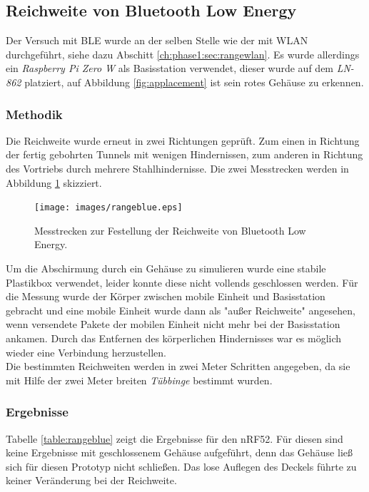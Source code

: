 \subsection{Reichweite von Bluetooth Low Energy}
Der Versuch mit BLE wurde an der selben Stelle wie der mit WLAN durchgeführt, siehe dazu Abschitt \ref{ch:phase1:sec:rangewlan}.
Es wurde allerdings ein \emph{Raspberry Pi Zero W} als Basisstation verwendet, dieser wurde auf dem \emph{LN-862} platziert, auf Abbildung \ref{fig:applacement} ist sein rotes Gehäuse zu erkennen.

\subsubsection{Methodik}
Die Reichweite wurde erneut in zwei Richtungen geprüft. 
Zum einen in Richtung der fertig gebohrten Tunnels mit wenigen Hindernissen, zum anderen in Richtung des Vortriebs durch mehrere Stahlhindernisse.
Die zwei Messtrecken werden in Abbildung \ref{fig:rangeblue} skizziert.

\begin{figure}[h!]
  \centering
	\texttt{[image: images/rangeblue.eps]}
  \caption{Messtrecken zur Festellung der Reichweite von Bluetooth Low Energy.}
  \label{fig:rangeblue}
\end{figure}

Um die Abschirmung durch ein Gehäuse zu simulieren wurde eine stabile Plastikbox verwendet, leider konnte diese nicht vollends geschlossen werden.
Für die Messung wurde der Körper zwischen mobile Einheit und Basisstation gebracht und eine mobile Einheit wurde dann als "außer Reichweite" angesehen, wenn versendete Pakete der mobilen Einheit nicht mehr bei der Basisstation ankamen.
Durch das Entfernen des körperlichen Hindernisses war es möglich wieder eine Verbindung herzustellen.\\
Die bestimmten Reichweiten werden in zwei Meter Schritten angegeben, da sie mit Hilfe der zwei Meter breiten \emph{Tübbinge} bestimmt wurden.

\subsubsection{Ergebnisse}
Tabelle \ref{table:rangeblue} zeigt die Ergebnisse für den nRF52.
Für diesen sind keine Ergebnisse mit geschlossenem Gehäuse aufgeführt, denn das Gehäuse ließ sich für diesen Prototyp nicht schließen.
Das lose Auflegen des Deckels führte zu keiner Veränderung bei der Reichweite.

